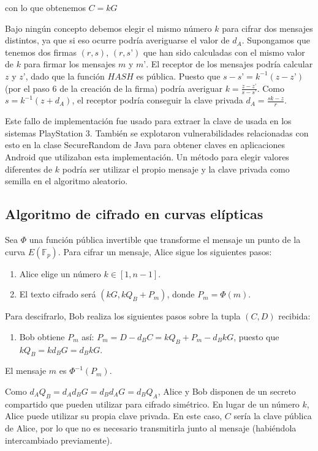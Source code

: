 \documentclass{article}
\begin{document}
con lo que obtenemos $C = kG$

Bajo ningún concepto debemos elegir el mismo número $k$ para cifrar
dos mensajes distintos, ya que si eso ocurre podría averiguarse el
valor de $d_A$. Supongamos que tenemos dos firmas $(r, s)$, $(r,s’)$
que han sido calculadas con el mismo valor de $k$ para firmar los
mensajes $m$ y $m’$. El receptor de los mensajes podría calcular $z$ y
$z’$, dado que la función $HASH$ es pública. Puesto que $s-s’ =
k^{-1}(z-z’)$ (por el paso 6 de la creación de la firma) podría
averiguar $k = \frac{z-z’}{s-s’}$. Como $s = k^{-1}(z+d_A)$, el
receptor podría conseguir la clave privada $d_A = \frac{sk-z}{r}$.

Este fallo de implementación fue usado para extraer la clave de usada
en los sistemas PlayStation 3. También se explotaron vulnerabilidades
relacionadas con esto en la clase SecureRandom de Java para obtener
claves en aplicaciones Android que utilizaban esta implementación. Un
método para elegir valores diferentes de $k$ podría ser utilizar el
propio mensaje y la clave privada como semilla en el algoritmo
aleatorio.

\subsection{Algoritmo de cifrado en curvas elípticas}

Sea $\Phi$ una función pública invertible que transforme el mensaje un
punto de la curva $E(\mathbb{F}_p)$. Para cifrar un mensaje, Alice
sigue los siguientes pasos:

\begin{enumerate}
\item Alice elige un número $k \in [1, n-1]$.
\item El texto cifrado será $(kG, kQ_B+P_m)$, donde $P_m = \Phi(m)$.
\end{enumerate}

Para descifrarlo, Bob realiza los siguientes pasos sobre la tupla
$(C,D)$ recibida:

\begin{enumerate}
\item Bob obtiene $P_m$ así: $P_m = D - d_BC = kQ_B + P_m - d_BkG$,
puesto que $kQ_B=kd_BG=d_BkG$.
\end{enumerate}

El mensaje $m$ es $\Phi^{-1}(P_m)$.

Como $d_A Q_B=d_A d_B G=d_B d_AG=d_B Q_A$, Alice y Bob disponen de un secreto compartido que pueden utilizar para cifrado simétrico. En lugar de un número $k$, Alice puede utilizar su propia clave privada. En este caso, $C$ sería la clave pública de Alice, por lo que no es necesario transmitirla junto al mensaje (habiéndola intercambiado previamente).
\end{document}
